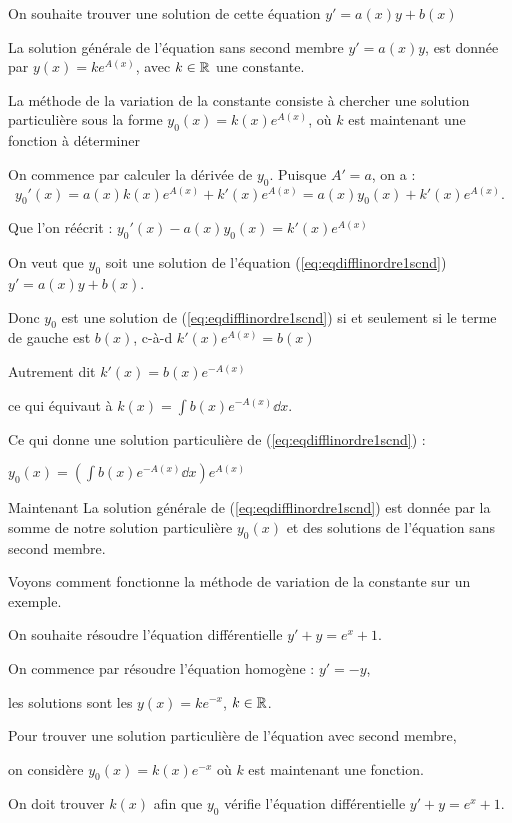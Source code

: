 \change
On souhaite trouver une solution de cette équation $y' = a(x) y  + b(x)$

\change
La solution générale de l'équation sans second membre
$y' = a(x) y$, est donnée 
par $y(x)=ke^{A(x)}$, avec $k\in \mathbb{R}$ une constante.

\change
La méthode de la variation de la constante consiste à chercher 
une solution particulière sous la forme $y_0(x)=k(x)e^{A(x)}$, 
où $k$ est maintenant une fonction à déterminer

\change 
On commence par calculer la dérivée de $y_0$.
Puisque $A'=a$, on a :
$$y_0'(x)=a(x)k(x)e^{A(x)} + k'(x)e^{A(x)}= a(x)y_0(x) + k'(x)e^{A(x)}.$$

\change
Que l'on réécrit : $y_0'(x) - a(x)y_0(x) = k'(x)e^{A(x)}$

\change
On veut que $y_0$ soit une solution de l'équation 
(\ref{eq:eqdifflinordre1scnd}) $y' = a(x) y  + b(x)$. 

Donc $y_0$ est une solution de (\ref{eq:eqdifflinordre1scnd}) 
si et seulement si
le terme de gauche est $b(x)$,
c-à-d $k'(x)e^{A(x)}=b(x)$

\change
Autrement dit $k'(x)=b(x)e^{-A(x)}$

\change
ce qui équivaut à $k(x)=\int b(x)e^{-A(x)}\dd x.$

\change
Ce qui donne une solution particulière  de (\ref{eq:eqdifflinordre1scnd}) : 

$y_0(x) = \left(\int b(x)e^{-A(x)}\dd x \right)e^{A(x)}$

\change
Maintenant 
La solution générale de  (\ref{eq:eqdifflinordre1scnd}) est donnée par
la somme de notre solution particulière $y_0(x)$
et des solutions de l'équation sans second membre.


\diapo

Voyons comment fonctionne la méthode de variation de la constante
sur un exemple.

On souhaite résoudre l'équation différentielle $y'+y = e^x+1$.

\change
On commence par résoudre l'équation homogène : $y'=-y$,

les solutions sont les $y(x) = k e^{-x}$, $k\in\mathbb{R}$. 

\change
Pour trouver une solution particulière de l'équation avec second membre,

on considère $y_0(x) = k(x) e^{-x}$ où $k$ est maintenant une fonction. 

\change
On doit trouver $k(x)$ afin que $y_0$ vérifie l'équation 
différentielle $y'+y = e^x+1$.

